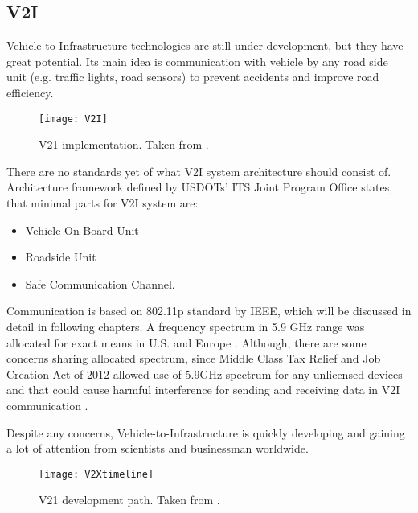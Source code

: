 \subsection{V2I}
% 
Vehicle-to-Infrastructure technologies are still under development, but they have great potential. Its main idea is communication with vehicle by any road side unit (e.g. traffic lights, road sensors) to prevent accidents and improve road efficiency.\par
% 
\begin{figure}[h]
\texttt{[image: V2I]}
\caption{V21 implementation. Taken from \cite{U.S.GovernmentAccountabilityOffice2015IntelligentExist}.}
\label{fig:V2Iimplementation}
\centering
\end{figure}
% 
There are no standards yet of what V2I system architecture should consist of. Architecture framework defined by USDOTs' ITS Joint Program Office \cite{Dr.Gaspar2014HighlySystems} states, that minimal parts for V2I system are:
\begin{itemize}[noitemsep,nolistsep]
    \item Vehicle On-Board Unit
    \item Roadside Unit
    \item Safe Communication Channel.
\end{itemize}
% 
Communication is based on 802.11p standard by IEEE, which will be discussed in detail in following chapters. A frequency spectrum in 5.9 GHz range was allocated for exact means in U.S. and Europe \cite{2011TheTechnology}. Although, there are some concerns sharing allocated spectrum, since Middle Class Tax Relief and Job Creation Act of 2012 allowed use of 5.9GHz spectrum for any unlicensed devices and that could cause harmful interference for sending and receiving data in V2I communication \cite{U.S.GovernmentAccountabilityOffice2015IntelligentExist}.\par
% 
Despite any concerns, Vehicle-to-Infrastructure is quickly developing and gaining a lot of attention from scientists and businessman worldwide.\par
%
\begin{figure}[h]
\texttt{[image: V2Xtimeline]}
\caption{V21 development path. Taken from \cite{U.S.GovernmentAccountabilityOffice2015IntelligentExist}.}
\label{fig:V2Idevelopment}
\centering
\end{figure}
